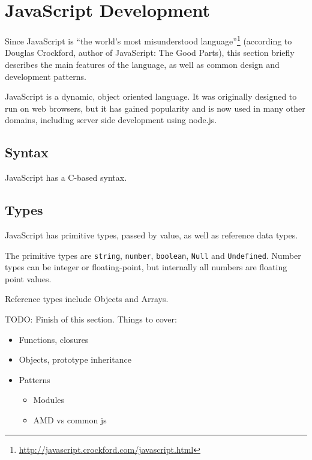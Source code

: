 \section{JavaScript Development} %
\label{sec:javascript_development}
Since JavaScript is ``the world's most misunderstood language''\footnote{\url{http://javascript.crockford.com/javascript.html}} (according to Douglas Crockford, author of JavaScript: The Good Parts\cite{crockfordjavascript}), this section briefly describes the main features of the language, as well as common design and development patterns.

JavaScript is a dynamic, object oriented language. It was originally designed to run on web browsers, but it has gained popularity and is now used in many other domains, including server side development using node.js. 

\subsection{Syntax} %
\label{sub:js_syntax}
JavaScript has a C-based syntax. 

\subsection{Types} %
\label{sub:js_types}
JavaScript has primitive types, passed by value, as well as reference data types.

The primitive types are \lstinline+string+, \lstinline+number+, \lstinline+boolean+, \lstinline+Null+ and \lstinline+Undefined+. Number types can be integer or floating-point, but internally all numbers are floating point values.

Reference types include Objects and Arrays. 



TODO: Finish of this section. Things to cover:

\begin{itemize}
	\item Functions, closures
	\item Objects, prototype inheritance
	\item Patterns
	\begin{itemize}
		\item Modules
		\item AMD vs common js
	\end{itemize}
\end{itemize}

